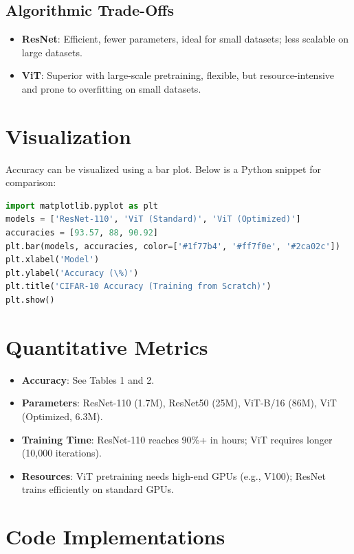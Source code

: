 \documentclass[UTF8]{report}
\theoremstyle{MyLineTheoremStyle} %
\theoremstyle{MyBlockTheoremStyle} %
\theoremstyle{MySubsubsectionStyle} %
\begin{document}
\subsection*{Algorithmic Trade-Offs}
\begin{itemize}
    \item \textbf{ResNet}: Efficient, fewer parameters, ideal for small datasets; less scalable on large datasets.
    \item \textbf{ViT}: Superior with large-scale pretraining, flexible, but resource-intensive and prone to overfitting on small datasets.
\end{itemize}

\section*{Visualization}
Accuracy can be visualized using a bar plot. Below is a Python snippet for comparison:

\begin{lstlisting}[language=Python]
import matplotlib.pyplot as plt
models = ['ResNet-110', 'ViT (Standard)', 'ViT (Optimized)']
accuracies = [93.57, 88, 90.92]
plt.bar(models, accuracies, color=['#1f77b4', '#ff7f0e', '#2ca02c'])
plt.xlabel('Model')
plt.ylabel('Accuracy (\%)')
plt.title('CIFAR-10 Accuracy (Training from Scratch)')
plt.show()
\end{lstlisting}

\section*{Quantitative Metrics}
\begin{itemize}
    \item \textbf{Accuracy}: See Tables 1 and 2.
    \item \textbf{Parameters}: ResNet-110 (1.7M), ResNet50 (25M), ViT-B/16 (86M), ViT (Optimized, 6.3M).
    \item \textbf{Training Time}: ResNet-110 reaches 90\%+ in hours; ViT requires longer (10,000 iterations).
    \item \textbf{Resources}: ViT pretraining needs high-end GPUs (e.g., V100); ResNet trains efficiently on standard GPUs.
\end{itemize}

\section*{Code Implementations}
\end{document}
